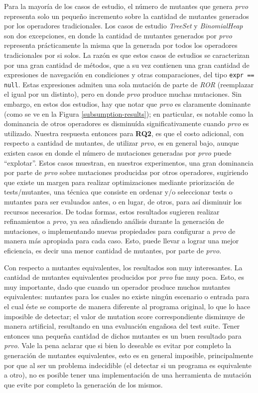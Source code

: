 Para la mayor\'ia de los casos de estudio, el n\'umero de mutantes que genera \emph{prvo} representa solo un peque\~no incremento sobre la cantidad de mutantes generados por los operadores tradicionales. Los casos de estudio \emph{TreeSet} y \emph{BinomialHeap} son dos excepciones, en donde la cantidad de mutantes generados por \emph{prvo} representa pr\'acticamente la misma que la generada por todos los operadores tradicionales por si solos. La raz\'on es que estos casos de estudios se caracterizan por una gran cantidad de m\'etodos, que a su vez contienen una gran cantidad de expresiones de navegaci\'on en condiciones y otras comparaciones, del tipo \texttt{expr == null}. Estas expresiones admiten una sola mutaci\'on de parte de \emph{ROR} (reemplazar el igual por un distinto), pero en donde \emph{prvo} produce muchas mutaciones. Sin embargo, en estos dos estudios, hay que notar que \emph{prvo} es claramente dominante (como se ve en la Figura \ref{subsumption-results}); en particular, es notable como la dominancia de otros operadores es disminu\'ida significativamente cuando \emph{prvo} es utilizado. Nuestra respuesta entonces para \textbf{RQ2}, es que el costo adicional, con respecto a cantidad de mutantes, de utilizar \emph{prvo}, es en general bajo, aunque existen casos en donde el n\'umero de mutaciones generadas por \emph{prvo} puede ``explotar''. Estos casos muestran, en nuestros experimentos, una gran dominancia por parte de \emph{prvo} sobre mutaciones producidas por otros operadores, sugiriendo que existe un margen para realizar optimizaciones mediante priorizaci\'on de tests/mutantes, una t\'ecnica que consiste en ordenar y/o seleccionar tests o mutantes para ser evaluados antes, o en lugar, de otros, para as\'i disminuir los recursos necesarios. De todas formas, estos resultados sugieren realizar refinamientos a \emph{prvo}, ya sea a\~nadiendo an\'alisis durante la generaci\'on de mutaciones, o implementando nuevas propiedades para configurar a \emph{prvo} de manera m\'as apropiada para cada caso. Esto, puede llevar a lograr una mejor eficiencia, es decir una menor cantidad de mutantes, por parte de \emph{prvo}.

Con respecto a mutantes equivalentes, los resultados son muy interesantes. La cantidad de mutantes equivalentes producidos por \emph{prvo} fue muy poca. Esto, es muy importante, dado que cuando un operador produce muchos mutantes equivalentes: mutantes para los cuales no existe ning\'un escenario o entrada para el cual \'este se comporte de manera diferente al programa original, lo que lo hace imposible de detectar; el valor de mutation score correspondiente disminuye de manera artificial, resultando en una evaluaci\'on enga\~nosa del test suite. Tener entonces una peque\~na cantidad de dichos mutantes es un buen resultado para \emph{prvo}. Vale la pena aclarar que si bien lo deseable es evitar por completo la generaci\'on de mutantes equivalentes, esto es en general imposible, principalmente por que al ser un problema indecidible (el detectar si un programa es equivalente a otro), no es posible tener una implementaci\'on de una herramienta de mutaci\'on que evite por completo la generaci\'on de los mismos.

